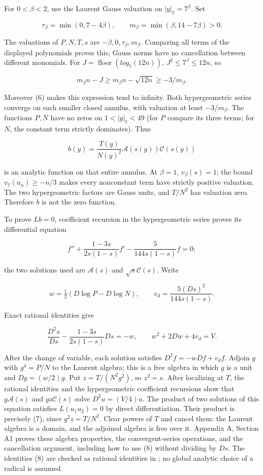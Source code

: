 \documentclass[11pt,a4paper]{article}
\begin{document}
For \(0<β<2\), use the Laurent Gauss valuation on \(|y|_{7}=7^β\). Set

\[
\tau_\beta=\min(0,7-4\beta),\qquad
m_\beta=\min(\beta,14-7\beta)>0.
\]

The valuations of \(P,N,T,s\) are \(-β,0,τ_β,m_β\). Comparing all terms of the displayed polynomials proves this; Gauss norms have no cancellation between different monomials. For \(J=\operatorname{floor}(log_{7}(12n))\), \(J^{2}≤7^J≤12n\), so

\[
m_\beta n-J\ge m_\beta n-\sqrt{12n}\ge-3/m_\beta.
\]

Moreover (6) makes this expression tend to infinity. Both hypergeometric series converge on each smaller closed annulus, with valuation at least \(-3/m_β\). The functions \(P,N\) have no zeros on \(1<|y|_{7}<49\) (for \(P\) compare its three terms; for \(N\), the constant term strictly dominates). Thus

\[
b(y)=\frac{T(y)}{N(y)^2}\mathcal A(s(y))\mathcal C(s(y))\tag{7}
\]

is an analytic function on that entire annulus. At \(β=1\), \(v_β(s)=1\); the bound \(v_{7}(u_n)≥-n/3\) makes every nonconstant term have strictly positive valuation. The two hypergeometric factors are Gauss units, and \(T/N^{2}\) has valuation zero. Therefore \(b\) is not the zero function.

To prove \(Lb=0\), coefficient recursion in the hypergeometric series proves its differential equation

\[
f''+\frac{1-3s}{2s(1-s)}f'-\frac{5}{144s(1-s)}f=0;
\]

the two solutions used are \(\mathcal{A}(s)\) and \(\surd s \mathcal{C}(s)\). Write

\[
w=\tfrac12(D\log P-D\log N),\qquad
v_d=\frac{5(Ds)^2}{144s(1-s)}.
\]

Exact rational identities give

\[
\frac{D^2s}{Ds}-\frac{1-3s}{2s(1-s)}Ds=-w,
\qquad w^2+2Dw+4v_d=V.\tag{8}
\]

After the change of variable, each solution satisfies \(D^{2}f=-wDf+v_df\). Adjoin \(g\) with \(g^{4}=P/N\) to the Laurent algebra; this is a free algebra in which \(g\) is a unit and \(Dg=(w/2)g\). Put \(z=T/(N^{2}g^{2})\), so \(z^{2}=s\). After localizing at \(T\), the rational identities and the hypergeometric coefficient recursions show that \(g\mathcal{A}(s)\) and \(gz\mathcal{C}(s)\) solve \(D^{2}u=(V/4)u\). The product of two solutions of this equation satisfies \(L(u_{1}u_{2})=0\) by direct differentiation. Their product is precisely (7), since \(g^{2}z=T/N^{2}\). Clear powers of \(T\) and cancel them: the Laurent algebra is a domain, and the adjoined algebra is free over it. Appendix A, Section A1 proves these algebra properties, the convergent-series operations, and the cancellation argument, including how to use (8) without dividing by \(Ds\). The identities (8) are checked as rational identities in ; no global analytic choice of a radical is assumed.
\end{document}
